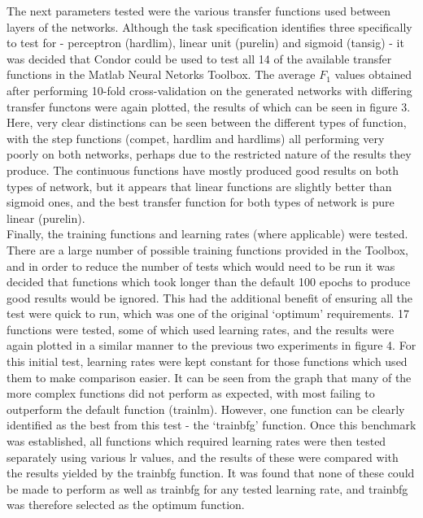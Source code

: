\documentclass[a4paper]{article}
\begin{document}
The next parameters tested were the various transfer functions used between layers of the networks. Although the task specification identifies
three specifically to test for - perceptron (hardlim), linear unit (purelin) and sigmoid (tansig) - it was decided that Condor could be used
to test all 14 of the available transfer functions in the Matlab Neural Netorks Toolbox. The average $F_1$ values obtained after performing
10-fold cross-validation on the generated networks with differing transfer functons were again plotted, the results of which can be seen in figure 3.
Here, very clear distinctions can be seen between the different types of function, with the step functions (compet, hardlim and hardlims) all
performing very poorly on both networks, perhaps due to the restricted nature of the results they produce. The continuous functions have mostly
produced good results on both types of network, but it appears that linear functions are slightly better than sigmoid ones, and the best transfer
function for both types of network is pure linear (purelin).\\

Finally, the training functions and learning rates (where applicable) were tested. There are a large number of possible training functions
provided in the Toolbox, and in order to reduce the number of tests which would need to be run it was decided that functions which took longer
than the default 100 epochs to produce good results would be ignored. This had the additional benefit of ensuring all the test were quick to run,
which was one of the original `optimum' requirements. 17 functions were tested, some of which used learning rates, and
the results were again plotted in a similar manner to the previous two experiments in figure 4. For this initial test, learning rates were kept
constant for those functions which used them to make comparison easier. It can be seen from the graph that many of the more complex functions
did not perform as expected, with most failing to outperform the default function (trainlm). However, one function can be clearly identified
as the best from this test - the `trainbfg' function. Once this benchmark was established, all functions which required learning rates were then
tested separately using various lr values, and the results of these were compared with the results yielded by the trainbfg function.
It was found that none of these could be made to perform as well as trainbfg for any tested learning rate, and trainbfg was therefore selected
as the optimum function.\\ 
\end{document}
